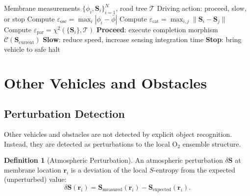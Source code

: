 \documentclass[12pt]{article}
\theoremstyle{definition}
\newtheorem{definition}[theorem]{Definition}
\theoremstyle{remark}
\begin{document}
\begin{algorithm}[H]
\caption{Sufficiency Recognition Protocol}
\label{alg:sufficiency}
\begin{algorithmic}[1]
\REQUIRE Membrane measurements $\{\phi_i, \mathbf{S}_i\}_{i=1}^{N}$, road tree $\mathcal{T}$
\ENSURE Driving action: proceed, slow, or stop
\STATE Compute $\varepsilon_{\mathrm{osc}} = \max_i |\phi_i - \bar{\phi}|$
\STATE Compute $\varepsilon_{\mathrm{cat}} = \max_{i,j} \|\mathbf{S}_i - \mathbf{S}_j\|$
\STATE Compute $\varepsilon_{\mathrm{par}} = \chi^2(\{\mathbf{S}_i\}, \mathcal{T})$
  \STATE \textbf{Proceed}: execute completion morphism $\mathcal{C}(\mathbf{S}_{\mathrm{current}})$
  \STATE \textbf{Slow}: reduce speed, increase sensing integration time
\ELSE
  \STATE \textbf{Stop}: bring vehicle to safe halt
\ENDIF
\end{algorithmic}
\end{algorithm}


\section{Other Vehicles and Obstacles}
\label{sec:obstacles}

\subsection{Perturbation Detection}

Other vehicles and obstacles are not detected by explicit object recognition. Instead, they are detected as perturbations to the local $\mathrm{O}_2$ ensemble structure.

\begin{definition}[Atmospheric Perturbation]
\label{def:perturbation}
An atmospheric perturbation $\delta\mathbf{S}$ at membrane location $\mathbf{r}_i$ is a deviation of the local $S$-entropy from the expected (unperturbed) value:
\begin{equation}
  \delta\mathbf{S}(\mathbf{r}_i) = \mathbf{S}_{\mathrm{measured}}(\mathbf{r}_i) - \mathbf{S}_{\mathrm{expected}}(\mathbf{r}_i).
  \label{eq:perturbation}
\end{equation}
\end{definition}
\end{document}
